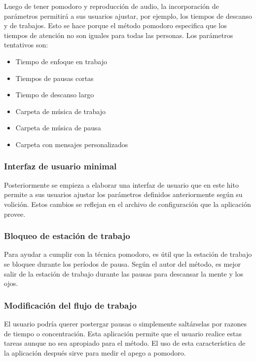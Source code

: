 \documentclass[12pt,letterpaper]{report}
\providecommand{\tightlist}{%
  \setlength{\itemsep}{0pt}\setlength{\parskip}{0pt}}
\begin{document}
Luego de tener pomodoro y reproducción de audio, la incorporación de
parámetros permitirá a sus usuarios ajustar, por ejemplo, los tiempos
de descanso y de trabajos. Esto se hace porque el método pomodoro
especifica que los tiempos de atención no son iguales para todas las
personas. Los parámetros tentativos son:

\begin{itemize}\tightlist{}
  \item Tiempo de enfoque en trabajo
  \item Tiempos de pausas cortas
  \item Tiempo de descanso largo
  \item Carpeta de música de trabajo
  \item Carpeta de música de pausa
  \item Carpeta con mensajes personalizados
\end{itemize}

\subsubsection{Interfaz de usuario minimal}

Posteriormente se empieza a elaborar una interfaz de usuario que en
este hito permite a sus usuarios ajustar los parámetros definidos
anteriormente según su volición. Estos cambios se reflejan en el
archivo de configuración que la aplicación provee.

\subsubsection{Bloqueo de estación de trabajo}

Para ayudar a cumplir con la técnica pomodoro, es útil que la estación
de trabajo se bloquee durante los períodos de pausa. Según el autor
del método, es mejor salir de la estación de trabajo durante las
pausas para descansar la mente y los ojos.

\subsubsection{Modificación del flujo de trabajo}

El usuario podría querer postergar pausas o simplemente saltárselas
por razones de tiempo o concentración. Esta aplicación permite que el
usuario realice estas tareas aunque no sea apropiado para el
método. El uso de esta característica de la aplicación después sirve
para medir el apego a pomodoro.
\end{document}
